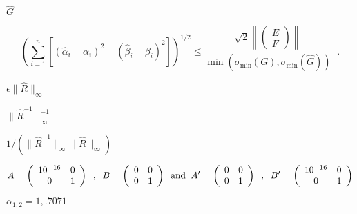 {\newpage\clearpage
{}%
$\hat{G}$%
\lthtmlinlinemathZ
\lthtmlcheckvsize\clearpage}

{\newpage\clearpage
{}%
\begin{displaymath}
\left( \sum_{i=1}^n [( \hat{\alpha}_i - \alpha_i )^2 +
                    ( \hat{\beta}_i - \beta_i )^2 ]  \right)^{1/2} \leq
\frac{\sqrt{2} \left\| \left( \begin{array}{c} E \\F \end{array} \right) \right\|}
{\min ( \sigma_{\min} (G) , \sigma_{\min} (\hat{G}) )}  \; \; .
\end{displaymath}%
\lthtmldisplayZ
\lthtmlcheckvsize\clearpage}

{\newpage\clearpage
{}%
$\epsilon \|\hat{R}\|_{\infty}$%
\lthtmlinlinemathZ
\lthtmlcheckvsize\clearpage}

{\newpage\clearpage
{}%
$\| \hat{R}^{-1} \|^{-1}_{\infty}$%
\lthtmlinlinemathZ
\lthtmlcheckvsize\clearpage}

{\newpage\clearpage
{}%
$1/ (\| \hat{R}^{-1} \|_{\infty} \| \hat{R} \|_{\infty})$%
\lthtmlinlinemathZ
\lthtmlcheckvsize\clearpage}

{\newpage\clearpage
{}%
\begin{displaymath}
A = \left( \begin{array}{cc} 10^{-16} & 0 \\0 & 1 \end{array} \right) 
\; \; , \; \;
B = \left( \begin{array}{cc} 0 & 0 \\0 & 1 \end{array} \right) 
\; \; {\rm and} \; \;
A' = \left( \begin{array}{cc} 0 & 0 \\0 & 1 \end{array} \right) 
\; \; , \; \;
B' = \left( \begin{array}{cc} 10^{-16} & 0 \\0 & 1 \end{array} \right) 
\end{displaymath}%
\lthtmldisplayZ
\lthtmlcheckvsize\clearpage}

{\newpage\clearpage
{}%
$\alpha_{1,2} = 1, .7071$%
\lthtmlinlinemathZ
\lthtmlcheckvsize\clearpage}

